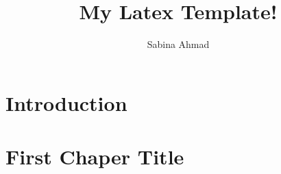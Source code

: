 \documentclass[12pt, a4paper]{article}
\title{My Latex Template!}
\author{Sabina Ahmad}
\date{} %
\begin{document}
\maketitle
\tableofcontents

\newpage


\section{Introduction} %


\newpage

\section{First Chaper Title}

\end{document}
